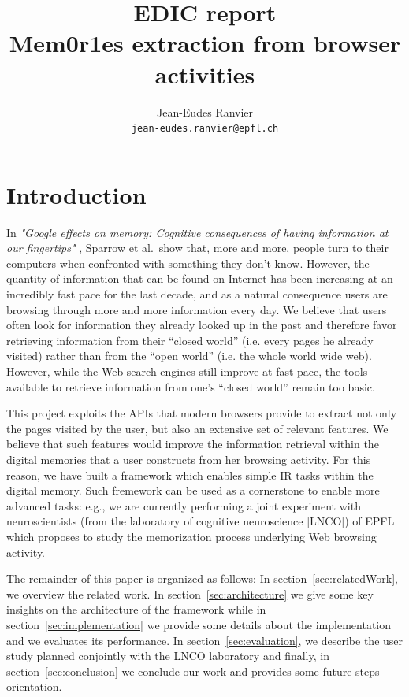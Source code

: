 \documentclass[10pt,a4paper]{article}
\title{ EDIC report \\ \large Mem0r1es extraction from browser activities}
\author{Jean-Eudes Ranvier\\\texttt{jean-eudes.ranvier@epfl.ch}}
\begin{document}
\sloppy

\maketitle

\section{Introduction}
In \textit{"Google effects on memory: Cognitive consequences of having information at our fingertips"} \cite{sparrow2011google}, Sparrow et al.~show that, more and more, people turn to their computers when confronted with something they don't know. However, the quantity of information that can be found on Internet has been increasing at an incredibly fast pace for the last decade, and as a natural consequence users are browsing through more and more information every day. We believe that users often look for information they already looked up in the past and therefore favor retrieving information from their ``closed world'' (i.e. every pages he already visited) rather than from the ``open world'' (i.e. the whole world wide web). However, while the Web search engines still improve at fast pace, the tools available to retrieve information from one's ``closed world'' remain too basic.

This project exploits the APIs that modern browsers provide to extract not only the pages visited by the user, but also an extensive set of relevant features. We believe that such features would improve the information retrieval within the digital memories that a user constructs from her browsing activity. For this reason, we have built a framework which enables simple IR tasks within the digital memory. Such fremework can be used as a cornerstone to enable more advanced tasks: e.g., we are currently performing a joint experiment with neuroscientists (from the laboratory of cognitive neuroscience [LNCO]) of EPFL which proposes to study the memorization process underlying Web browsing activity.

The remainder of this paper is organized as follows: In section~\ref{sec:relatedWork}, we overview the related work. In section~\ref{sec:architecture} we give some key insights on the architecture of the framework while in section~\ref{sec:implementation} we provide some details about the implementation and we evaluates its performance. In section~\ref{sec:evaluation}, we describe the user study planned conjointly with the LNCO laboratory and finally, in section~\ref{sec:conclusion} we conclude our work and provides some future steps orientation.
\end{document}
